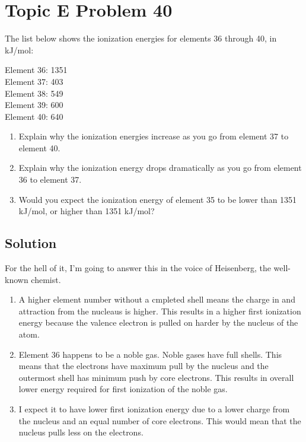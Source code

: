 \documentclass[10pt]{article}
\begin{document}
    \section{Topic E Problem 40}
        The list below shows the ionization energies for elements 36 through 40, in kJ/mol:
        \begin{multicols}{3}
            Element 36: 1351\\
            Element 37: 403\\
            Element 38: 549\\
            Element 39: 600\\
            Element 40: 640
        \end{multicols}
        \begin{enumerate}[label=\alph*)]
            \item   Explain why the ionization energies increase as you go from element 37 to element 40.
            \item   Explain why the ionization energy drops dramatically as you go from element 36 to element 37.
            \item   Would you expect the ionization energy of element 35 to be lower than 1351 kJ/mol, or higher than 1351 kJ/mol?
        \end{enumerate}

        \subsection{Solution}
            For the hell of it, I'm going to answer this in the voice of Heisenberg, the well-known chemist.
            \begin{enumerate}[label=\alph*)]
                \item   A higher element number without a cmpleted shell means the charge in and attraction from the nucleaus is higher.
                    This results in a higher first ionization energy because the valence electron is pulled on harder by the nucleus of the atom.
                \item   Element 36 happens to be a noble gas. 
                    Noble gases have full shells. 
                    This means that the electrons have maximum pull by the nucleus and the outermost shell has minimum push by core electrons.
                    This results in overall lower energy required for first ionization of the noble gas.
                \item   I expect it to have lower first ionization energy due to a lower charge from the nucleus and an equal number of core electrons.
                    This would mean that the nucleus pulls less on the electrons.
            \end{enumerate}
\end{document}
